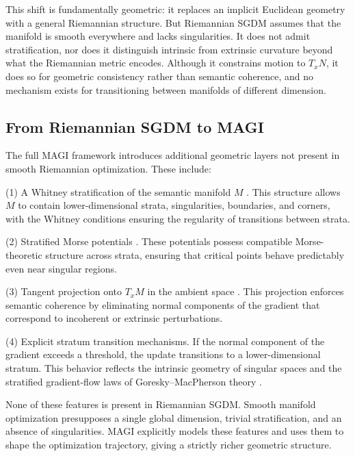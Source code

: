 \documentclass[12pt]{article}
\begin{document}
This shift is fundamentally geometric: it replaces an implicit Euclidean geometry with a general Riemannian structure. But Riemannian SGDM assumes that the manifold is smooth everywhere and lacks singularities. It does not admit stratification, nor does it distinguish intrinsic from extrinsic curvature beyond what the Riemannian metric encodes. Although it constrains motion to $T_xN$, it does so for geometric consistency rather than semantic coherence, and no mechanism exists for transitioning between manifolds of different dimension.

\subsection*{From Riemannian SGDM to MAGI}

The full MAGI framework introduces additional geometric layers not present in smooth Riemannian optimization. These include:

(1) A Whitney stratification of the semantic manifold $M$ \citep{Whitney1965,Mather1973,GoreskyMacPherson1988}.  
This structure allows $M$ to contain lower-dimensional strata, singularities, boundaries, and corners, with the Whitney conditions ensuring the regularity of transitions between strata.

(2) Stratified Morse potentials \citep{GoreskyMacPherson1988,Milnor1963}.  
These potentials possess compatible Morse-theoretic structure across strata, ensuring that critical points behave predictably even near singular regions.

(3) Tangent projection onto $T_xM$ in the ambient space \citep{doCarmoRiemannian1992}.  
This projection enforces semantic coherence by eliminating normal components of the gradient that correspond to incoherent or extrinsic perturbations.

(4) Explicit stratum transition mechanisms.  
If the normal component of the gradient exceeds a threshold, the update transitions to a lower-dimensional stratum. This behavior reflects the intrinsic geometry of singular spaces and the stratified gradient-flow laws of Goresky–MacPherson theory \citep{GoreskyMacPherson1988}.

None of these features is present in Riemannian SGDM. Smooth manifold optimization presupposes a single global dimension, trivial stratification, and an absence of singularities. MAGI explicitly models these features and uses them to shape the optimization trajectory, giving a strictly richer geometric structure.
\end{document}
